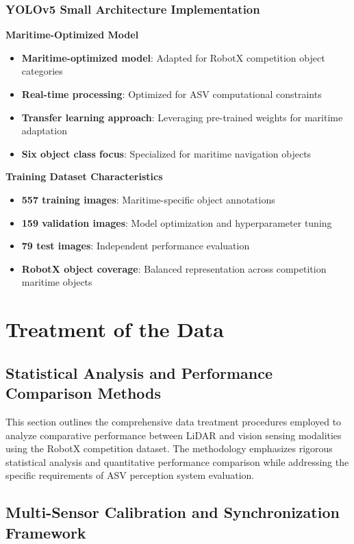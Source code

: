 \documentclass{erauthesis}
\begin{document}
\subsubsection{YOLOv5 Small Architecture Implementation}

\textbf{Maritime-Optimized Model}
\begin{itemize}
\item \textbf{Maritime-optimized model}: Adapted for RobotX competition object categories
\item \textbf{Real-time processing}: Optimized for ASV computational constraints
\item \textbf{Transfer learning approach}: Leveraging pre-trained weights for maritime adaptation
\item \textbf{Six object class focus}: Specialized for maritime navigation objects
\end{itemize}

\textbf{Training Dataset Characteristics}
\begin{itemize}
\item \textbf{557 training images}: Maritime-specific object annotations
\item \textbf{159 validation images}: Model optimization and hyperparameter tuning
\item \textbf{79 test images}: Independent performance evaluation
\item \textbf{RobotX object coverage}: Balanced representation across competition maritime objects
\end{itemize}

\section{Treatment of the Data}

\subsection{Statistical Analysis and Performance Comparison Methods}

This section outlines the comprehensive data treatment procedures employed to analyze comparative performance between LiDAR and vision sensing modalities using the RobotX competition dataset. The methodology emphasizes rigorous statistical analysis and quantitative performance comparison while addressing the specific requirements of ASV perception system evaluation.

\subsection{Multi-Sensor Calibration and Synchronization Framework}
\end{document}
